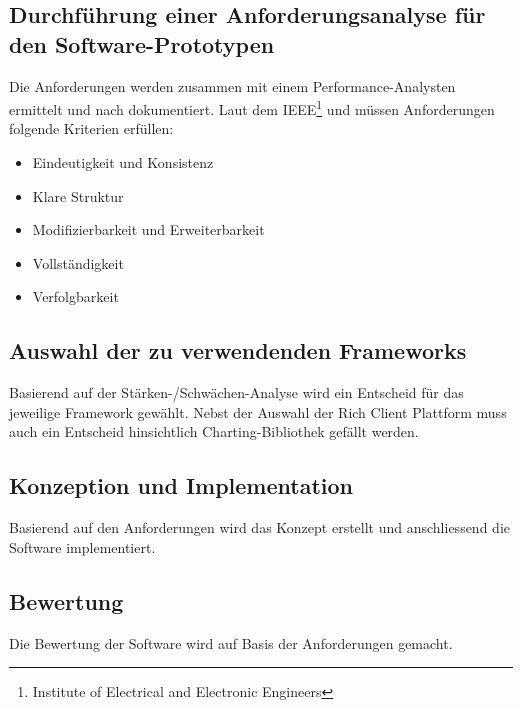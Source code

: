 \subsection{Durchführung einer Anforderungsanalyse für den Software-Prototypen}
Die Anforderungen werden zusammen mit einem Performance-Analysten ermittelt und nach \cite[4.3.2 Angepasste Standardinhalte]{pohl2010basiswissen} dokumentiert. Laut dem IEEE\footnote{Institute of Electrical and Electronic Engineers} und \cite[4.5 Qualitätskriterien für das Anforderungsdokument]{pohl2010basiswissen} müssen Anforderungen folgende Kriterien erfüllen:
\begin{itemize}
	\item Eindeutigkeit und Konsistenz
	\item Klare Struktur
	\item Modifizierbarkeit und Erweiterbarkeit
	\item Vollständigkeit
	\item Verfolgbarkeit
\end{itemize}
\subsection{Auswahl der zu verwendenden Frameworks}
Basierend auf der Stärken-/Schwächen-Analyse wird ein Entscheid für das jeweilige Framework gewählt. Nebst der Auswahl der Rich Client Plattform muss auch ein Entscheid hinsichtlich Charting-Bibliothek gefällt werden.

\subsection{Konzeption und Implementation}
Basierend auf den Anforderungen wird das Konzept erstellt und anschliessend die Software implementiert. 

\subsection{Bewertung}
Die Bewertung der Software wird auf Basis der Anforderungen gemacht.



